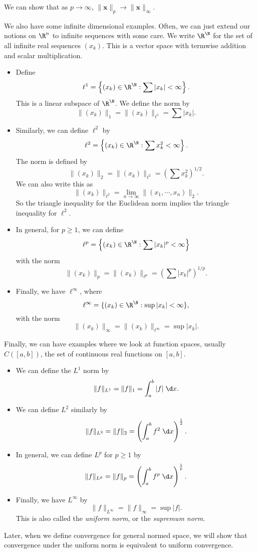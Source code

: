\documentclass[a4paper]{article}
\begin{document}
\begin{eg}
\begin{itemize}
      We can show that as $p\to \infty$, $\|\mathbf{x}\|_p \to \|\mathbf{x}\|_\infty$.
  \end{itemize}
  We also have some infinite dimensional examples. Often, we can just extend our notions on $\R^n$ to infinite sequences with some care. We write $\R^\N$ for the set of all infinite real sequences $(x_k)$. This is a vector space with termwise addition and scalar multiplication.
  \begin{itemize}
    \item Define
      \[
        \ell^1 = \left\{(x_k) \in \R^\N: \sum |x_k| < \infty\right\}.
      \]
      This is a linear subspace of $\R^\N$. We define the norm by
      \[
        \|(x_k)\|_1 = \|(x_k)\|_{\ell^1} = \sum |x_k|.
      \]
    \item Similarly, we can define $\ell^2$ by
      \[
        \ell^2 = \left\{(x_k) \in \R^\N: \sum x_k^2 < \infty\right\}.
      \]
      The norm is defined by
      \[
        \|(x_k)\|_2 = \|(x_k)\|_{\ell^2} = \left(\sum x_k^2\right)^{1/2}.
      \]
      We can also write this as
      \[
        \|(x_k)\|_{\ell^2} = \lim_{n \to \infty} \|(x_1, \cdots, x_n)\|_2.
      \]
      So the triangle inequality for the Euclidean norm implies the triangle inequality for $\ell^2$.
    \item In general, for $p \geq 1$, we can define
      \[
        \ell^p = \left\{(x_k) \in \R^\N: \sum |x_k|^p < \infty\right\}
      \]
      with the norm
      \[
        \|(x_k)\|_p = \|(x_k)\|_{\ell^p} = \left(\sum |x_k|^p\right)^{1/p}.
      \]
    \item Finally, we have $\ell^\infty$, where
      \[
        \ell^\infty = \{(x_k)\in \R^\N: \sup |x_k| < \infty\},
      \]
      with the norm
      \[
        \|(x_k)\|_\infty = \|(x_k)\|_{\ell^\infty} = \sup |x_k|.
      \]
  \end{itemize}
  Finally, we can have examples where we look at function spaces, usually $C([a, b])$, the set of continuous real functions on $[a, b]$.
  \begin{itemize}
    \item We can define the $L^1$ norm by
      \[
        \|f\|_{L^1} = \|f\|_1 = \int_a^b |f|\;\d x.
      \]
    \item We can define $L^2$ similarly by
      \[
        \|f\|_{L^2} = \|f\|_2 = \left(\int_a^b f^2 \;\d x\right)^{\frac{1}{2}}.
      \]
    \item In general, we can define $L^p$ for $p \geq 1$ by
      \[
        \|f\|_{L^p} = \|f\|_p = \left(\int_a^b f^p \;\d x\right)^{\frac{1}{p}}.
      \]
    \item Finally, we have $L^\infty$ by
      \[
        \|f\|_{L^\infty} = \|f\|_\infty = \sup |f|.
      \]
      This is also called the \emph{uniform norm}, or the \emph{supremum norm}.
  \end{itemize}
\end{eg}
Later, when we define convergence for general normed space, we will show that convergence under the uniform norm is equivalent to uniform convergence.
\end{document}
